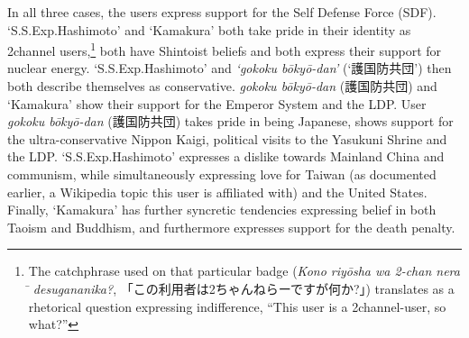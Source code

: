 \documentclass[10pt,british,A4paper,twoside]{memoir}
\begin{document}
In all three cases, the users express support for the Self Defense Force
(SDF). `S.S.Exp.Hashimoto' and `Kamakura' both take pride in their
identity as 2channel users,\footnote{The catchphrase used on that
  particular badge (\emph{Kono riyōsha wa 2-chan nera ̄ desugananika?},
  「この利用者は2ちゃんねらーですが何か?」) translates as a rhetorical
  question expressing indifference, ``This user is a 2channel-user, so
  what?''} both have Shintoist beliefs and both express their support
for nuclear energy. `S.S.Exp.Hashimoto' and \emph{`gokoku bōkyō-dan'}
(`護国防共団') then both describe themselves as conservative.
\emph{gokoku bōkyō-dan} (護国防共団) and `Kamakura' show their support
for the Emperor System and the LDP. User \emph{gokoku bōkyō-dan}
(護国防共団) takes pride in being Japanese, shows support for the
ultra-conservative Nippon Kaigi, political visits to the Yasukuni Shrine
and the LDP. `S.S.Exp.Hashimoto' expresses a dislike towards Mainland
China and communism, while simultaneously expressing love for Taiwan (as
documented earlier, a Wikipedia topic this user is affiliated with) and
the United States. Finally, `Kamakura' has further syncretic tendencies
expressing belief in both Taoism and Buddhism, and furthermore expresses
support for the death penalty.
\end{document}
